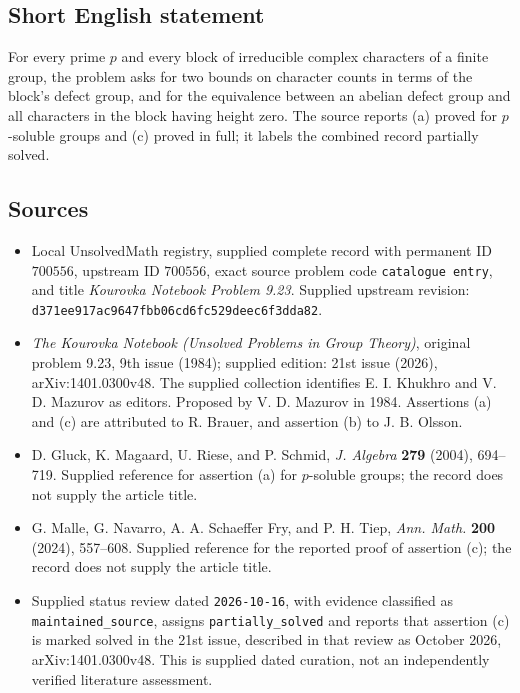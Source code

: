 \documentclass[11pt]{article}
\begin{document}
\subsection{Short English statement}
For every prime \(p\) and every block of irreducible complex characters of a finite group, the problem asks for two bounds on character counts in terms of the block's defect group, and for the equivalence between an abelian defect group and all characters in the block having height zero. The source reports (a) proved for \(p\)-soluble groups and (c) proved in full; it labels the combined record partially solved.
\subsection{Sources}
\begin{itemize}
\item Local UnsolvedMath registry, supplied complete record with permanent ID \(700556\), upstream ID \(700556\), exact source problem code \texttt{catalogue entry}, and title \emph{Kourovka Notebook Problem 9.23}. Supplied upstream revision: \texttt{d371ee917ac9647fbb06cd6fc529deec6f3dda82}.
\item \emph{The Kourovka Notebook (Unsolved Problems in Group Theory)}, original problem 9.23, 9th issue (1984); supplied edition: 21st issue (2026), arXiv:1401.0300v48. The supplied collection identifies E. I. Khukhro and V. D. Mazurov as editors. Proposed by V. D. Mazurov in 1984. Assertions (a) and (c) are attributed to R. Brauer, and assertion (b) to J. B. Olsson.
\item D. Gluck, K. Magaard, U. Riese, and P. Schmid, \emph{J. Algebra} \textbf{279} (2004), 694--719. Supplied reference for assertion (a) for \(p\)-soluble groups; the record does not supply the article title.
\item G. Malle, G. Navarro, A. A. Schaeffer Fry, and P. H. Tiep, \emph{Ann. Math.} \textbf{200} (2024), 557--608. Supplied reference for the reported proof of assertion (c); the record does not supply the article title.
\item Supplied status review dated \texttt{2026-10-16}, with evidence classified as \texttt{maintained\_source}, assigns \texttt{partially\_solved} and reports that assertion (c) is marked solved in the 21st issue, described in that review as October 2026, arXiv:1401.0300v48. This is supplied dated curation, not an independently verified literature assessment.
\end{itemize}
\end{document}
